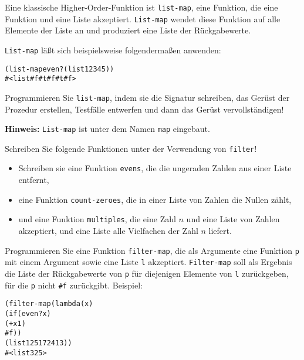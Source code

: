 \begin{aufgabe}
  Eine klassische Higher-Order-Funktion ist \texttt{list-map}, eine Funktion, die 
  eine Funktion und eine Liste akzeptiert.  \texttt{List-map}
  wendet diese Funktion auf alle Elemente der Liste an und produziert
  eine Liste der Rückgabewerte.

  \texttt{List-map} läßt sich beispielsweise folgendermaßen anwenden:
  \begin{alltt}
    (list-map even? (list 1 2 3 4 5))
    \evalsto{} #<list #f #t #f #t #f>
  \end{alltt}
  Programmieren Sie \texttt{list-map}, indem sie die Signatur schreiben,
  das Gerüst der Prozedur erstellen, Testfälle entwerfen und dann das
  Gerüst vervollständigen!

  \textbf{Hinweis:} \texttt{List-map} ist unter dem Namen \texttt{map} eingebaut.
\end{aufgabe}

\begin{aufgabe}
  Schreiben Sie folgende Funktionen unter der  
  Verwendung von \texttt{filter}!
  \begin{itemize}
    \item Schreiben sie eine Funktion \texttt{evens}, die die ungeraden Zahlen aus 
      einer Liste entfernt,
  \item eine Funktion \texttt{count-zeroes}, die in einer Liste von
    Zahlen die Nullen zählt,
  \item und eine Funktion \texttt{multiples}, die eine Zahl $n$ und
    eine Liste von Zahlen akzeptiert, und eine Liste alle Vielfachen
    der Zahl $n$ liefert.
  \end{itemize}
\end{aufgabe}

\begin{aufgabe}
  Programmieren Sie eine Funktion
  \texttt{filter-map}, die als Argumente eine Funktion \texttt{p} mit
  einem Argument sowie eine Liste \texttt{l} akzeptiert.
  \texttt{Filter-map} soll als Ergebnis die Liste der Rückgabewerte
  von \texttt{p} für diejenigen Elemente von \texttt{l} zurückgeben,
  für die \texttt{p} nicht \texttt{\#f} zurückgibt. Beispiel:

\begin{alltt}
(filter-map (lambda (x)
               (if (even? x)
                  (+ x 1)
                  #f))
            (list 1 2 5 17 24 13))
\evalsto{} #<list 3 25>
\end{alltt}
\end{aufgabe}

